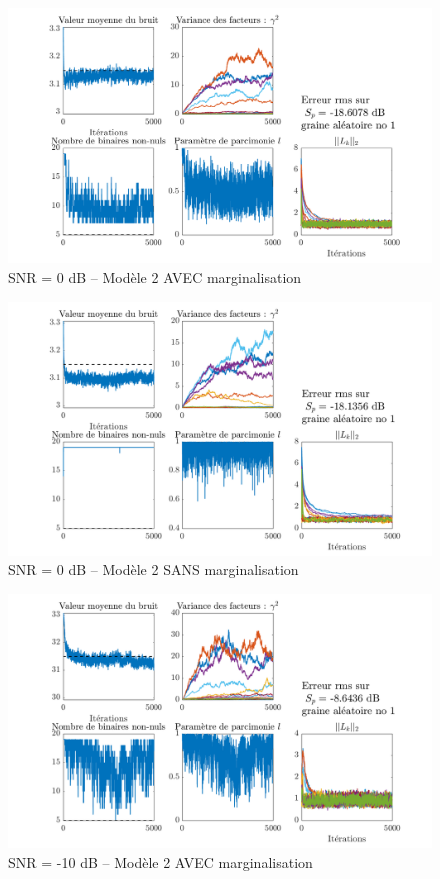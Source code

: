 \documentclass[ 12pt]{article}
\begin{document}
\begin{figure}[H]
	\centering
	\includegraphics[width=\textwidth]{ToyCase/margon.png}
	\caption{SNR = 0 dB -- Modèle 2 AVEC marginalisation}
\end{figure}
\begin{figure}[H]
	\centering
	\includegraphics[width=\textwidth]{ToyCase/margoff.png}
	\caption{SNR = 0 dB -- Modèle 2 SANS marginalisation}
\end{figure}
\begin{figure}[H]
	\centering
	\includegraphics[width=\textwidth]{ToyCase/margon_snrm10db.png}
	\caption{SNR = -10 dB -- Modèle 2 AVEC marginalisation}
\end{figure}
\end{document}
